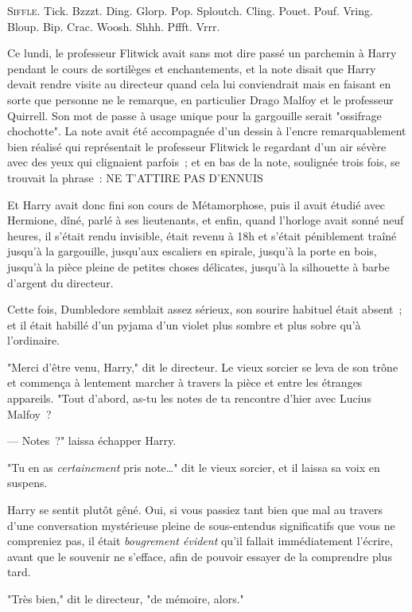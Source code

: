 
\lettrine{S}{iffle}.  Tick. Bzzzt. Ding. Glorp. Pop. Sploutch. Cling. Pouet. Pouf. Vring. Bloup. Bip. Crac. Woosh. Shhh. Pffft. Vrrr.

Ce lundi, le professeur Flitwick avait sans mot dire passé un parchemin à Harry pendant le cours de sortilèges et enchantements, et la note disait que Harry devait rendre visite au directeur quand cela lui conviendrait mais en faisant en sorte que personne ne le remarque, en particulier Drago Malfoy et le professeur Quirrell. Son mot de passe à usage unique pour la gargouille serait "ossifrage chochotte". La note avait été accompagnée d'un dessin à l'encre remarquablement bien réalisé qui représentait le professeur Flitwick le regardant d'un air sévère avec des yeux qui clignaient parfois~; et en bas de la note, soulignée trois fois, se trouvait la phrase~: NE T'ATTIRE PAS D'ENNUIS

Et Harry avait donc fini son cours de Métamorphose, puis il avait étudié avec Hermione, dîné, parlé à ses lieutenants, et enfin, quand l'horloge avait sonné neuf heures, il s'était rendu invisible, était revenu à 18h et s'était péniblement traîné jusqu'à la gargouille, jusqu'aux escaliers en spirale, jusqu'à la porte en bois, jusqu'à la pièce pleine de petites choses délicates, jusqu'à la silhouette à barbe d'argent du directeur.

Cette fois, Dumbledore semblait assez sérieux, son sourire habituel était absent~; et il était habillé d'un pyjama d'un violet plus sombre et plus sobre qu'à l'ordinaire.

"Merci d'être venu, Harry," dit le directeur. Le vieux sorcier se leva de son trône et commença à lentement marcher à travers la pièce et entre les étranges appareils. "Tout d'abord, as-tu les notes de ta rencontre d'hier avec Lucius Malfoy~?

--- Notes~?" laissa échapper Harry.

"Tu en as \emph{certainement} pris note…" dit le vieux sorcier, et il laissa sa voix en suspens.

Harry se sentit plutôt gêné. Oui, si vous passiez tant bien que mal au travers d'une conversation mystérieuse pleine de sous-entendus significatifs que vous ne compreniez pas, il était \emph{bougrement évident} qu'il fallait immédiatement l'écrire, avant que le souvenir ne s'efface, afin de pouvoir essayer de la comprendre plus tard.

"Très bien," dit le directeur, "de mémoire, alors."

